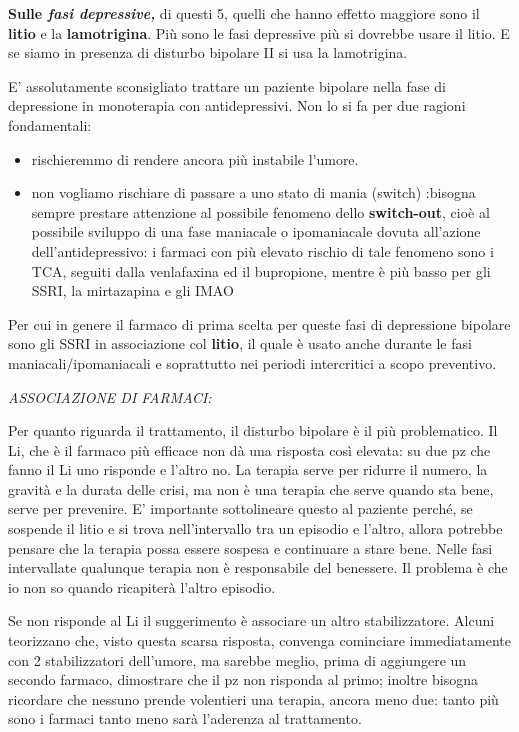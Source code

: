 \documentclass[]{article}
\begin{document}
\textbf{Sulle \emph{fasi depressive,}} di questi 5, quelli che hanno
effetto maggiore sono il \textbf{litio} e la \textbf{lamotrigina}. Più
sono le fasi depressive più si dovrebbe usare il litio. E se siamo in
presenza di disturbo bipolare II si usa la lamotrigina.

E' assolutamente sconsigliato trattare un paziente bipolare nella fase
di depressione in monoterapia con antidepressivi. Non lo si fa per due
ragioni fondamentali:

\begin{itemize}
\item
  rischieremmo di rendere ancora più instabile l'umore.
\item
  non vogliamo rischiare di passare a uno stato di mania (switch)
  :bisogna sempre prestare attenzione al possibile fenomeno dello
  \textbf{switch-out}, cioè al possibile sviluppo di una fase maniacale
  o ipomaniacale dovuta all'azione dell'antidepressivo: i farmaci con
  più elevato rischio di tale fenomeno sono i TCA, seguiti dalla
  venlafaxina ed il bupropione, mentre è più basso per gli SSRI, la
  mirtazapina e gli IMAO
\end{itemize}

Per cui in genere il farmaco di prima scelta per queste fasi di
depressione bipolare sono gli SSRI in associazione col \textbf{litio},
il quale è usato anche durante le fasi maniacali/ipomaniacali e
soprattutto nei periodi intercritici a scopo preventivo.

\emph{ASSOCIAZIONE DI FARMACI:}

Per quanto riguarda il trattamento, il disturbo bipolare è il più
problematico. Il Li, che è il farmaco più efficace non dà una risposta
così elevata: su due pz che fanno il Li uno risponde e l'altro no. La
terapia serve per ridurre il numero, la gravità e la durata delle crisi,
ma non è una terapia che serve quando sta bene, serve per prevenire. E'
importante sottolineare questo al paziente perché, se sospende il litio
e si trova nell'intervallo tra un episodio e l'altro, allora potrebbe
pensare che la terapia possa essere sospesa e continuare a stare bene.
Nelle fasi intervallate qualunque terapia non è responsabile del
benessere. Il problema è che io non so quando ricapiterà l'altro
episodio.

Se non risponde al Li il suggerimento è associare un altro
stabilizzatore. Alcuni teorizzano che, visto questa scarsa risposta,
convenga cominciare immediatamente con 2 stabilizzatori dell'umore, ma
sarebbe meglio, prima di aggiungere un secondo farmaco, dimostrare che
il pz non risponda al primo; inoltre bisogna ricordare che nessuno
prende volentieri una terapia, ancora meno due: tanto più sono i farmaci
tanto meno sarà l'aderenza al trattamento.
\end{document}

